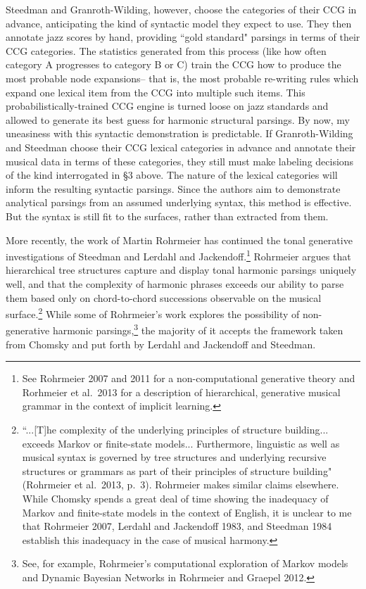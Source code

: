 Steedman and Granroth-Wilding, however, choose the categories of their CCG in advance, anticipating the kind of syntactic model they expect to use.  They then annotate jazz scores by hand, providing ``gold standard" parsings in terms of their CCG categories.  The statistics generated from this process (like how often category A progresses to category B or C) train the CCG how to produce the most probable node expansions-- that is, the most probable re-writing rules which expand one lexical item from the CCG into multiple such items.  This probabilistically-trained CCG engine is turned loose on jazz standards and allowed to generate its best guess for harmonic structural parsings.  By now, my uneasiness with this syntactic demonstration is predictable.  If Granroth-Wilding and Steedman choose their CCG lexical categories in advance and annotate their musical data in terms of these categories, they still must make labeling decisions of the kind interrogated in \S 3 above.  The nature of the lexical categories will inform the resulting syntactic parsings.  Since the authors aim to demonstrate analytical parsings from an assumed underlying syntax, this method is effective.  But the syntax is still fit to the surfaces, rather than extracted from them.

More recently, the work of Martin Rohrmeier has continued the tonal generative investigations of Steedman and Lerdahl and Jackendoff.\footnote{See Rohrmeier 2007 and 2011 for a non-computational generative theory and Rorhmeier et al.\ 2013 for a description of hierarchical, generative musical grammar in the context of implicit learning.}  Rohrmeier argues that hierarchical tree structures capture and display tonal harmonic parsings uniquely well, and that the complexity of harmonic phrases exceeds our ability to parse them based only on chord-to-chord successions observable on the musical surface.\footnote{``...[T]he complexity of the underlying principles of structure building... exceeds Markov or finite-state models... Furthermore, linguistic as well as musical syntax is governed by tree structures and underlying recursive structures or grammars as part of their principles of structure building" (Rohrmeier et al.\ 2013, p.\ 3).  Rohrmeier makes similar claims elsewhere.  While Chomsky spends a great deal of time showing the inadequacy of Markov and finite-state models in the context of English, it is unclear to me that Rohrmeier 2007, Lerdahl and Jackendoff 1983, and Steedman 1984 establish this inadequacy in the case of musical harmony.}  While some of Rohrmeier's work explores the possibility of non-generative harmonic parsings,\footnote{See, for example, Rohrmeier's computational exploration of Markov models and Dynamic Bayesian Networks in Rohrmeier and Graepel 2012.} the majority of it accepts the framework taken from Chomsky and put forth by Lerdahl and Jackendoff and Steedman.

